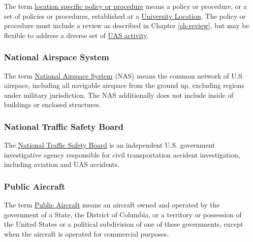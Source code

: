 \documentclass[
]{book}
\begin{document}
The term \protect\hyperlink{LSP}{location specific policy or procedure} means a policy or procedure, or a set of policies or procedures, established at a \protect\hyperlink{UL}{University Location}. The policy or procedure must include a review as described in Chapter \ref{ch-review}, but may be flexible to address a diverse set of \protect\hyperlink{UASactivity}{UAS activity}.





\hypertarget{NAS}{%
\subsubsection*{National Airspace System}\label{NAS}}

The term \protect\hyperlink{NAS}{National Airspace System} (NAS) means the common network of U.S. airspace, including all navigable airspace from the ground up, excluding regions under military jurisdiction. The NAS additionally does not include inside of buildings or enclosed structures.





\hypertarget{NTSB}{%
\subsubsection*{National Traffic Safety Board}\label{NTSB}}

The \protect\hyperlink{NTSB}{National Traffic Safety Board} is an independent U.S. government investigative agency responsible for civil transportation accident investigation, including aviation and UAS accidents.



\hypertarget{PA}{%
\subsubsection*{Public Aircraft}\label{PA}}

The term \protect\hyperlink{PA}{Public Aircraft} means an aircraft owned and operated by the government of a State, the District of Columbia, or a territory or possession of the United States or a political subdivision of one of these governments, except when the aircraft is operated for commercial purposes.
\end{document}
